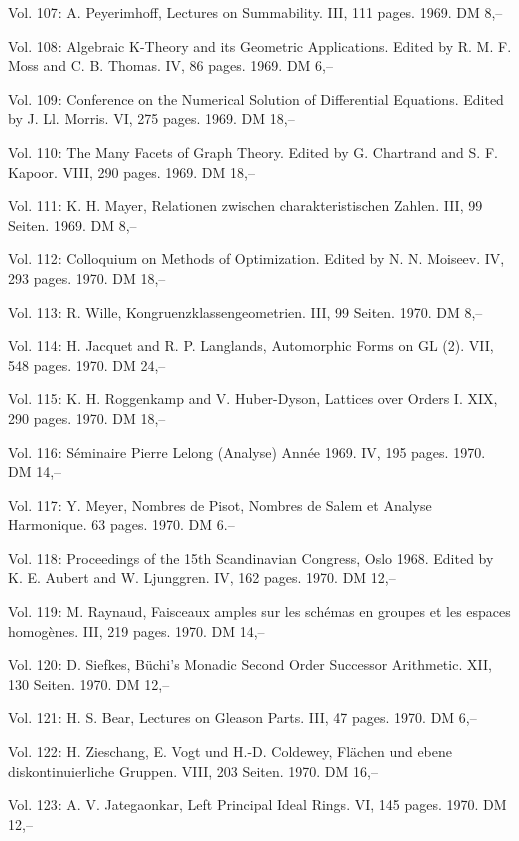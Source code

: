 Vol. 107: A. Peyerimhoff, Lectures on Summability. III, 111 pages. 1969. DM 8,--

Vol. 108: Algebraic K-Theory and its Geometric Applications. Edited by R. M. F. Moss and C. B. Thomas. IV, 86 pages. 1969. DM 6,--

Vol. 109: Conference on the Numerical Solution of Differential Equations. Edited by J. Ll. Morris. VI, 275 pages. 1969. DM 18,--

Vol. 110: The Many Facets of Graph Theory. Edited by G. Chartrand and S. F. Kapoor. VIII, 290 pages. 1969. DM 18,--

%
Vol. 111: K. H. Mayer, Relationen zwischen charakteristischen Zahlen. III, 99 Seiten. 1969. DM 8,--

Vol. 112: Colloquium on Methods of Optimization. Edited by N. N. Moiseev. IV, 293 pages. 1970. DM 18,--

Vol. 113: R. Wille, Kongruenzklassengeometrien. III, 99 Seiten. 1970. DM 8,--

Vol. 114: H. Jacquet and R. P. Langlands, Automorphic Forms on GL (2). VII, 548 pages. 1970. DM 24,--

Vol. 115: K. H. Roggenkamp and V. Huber-Dyson, Lattices over Orders I. XIX, 290 pages. 1970. DM 18,--

Vol. 116: Séminaire Pierre Lelong (Analyse) Année 1969. IV, 195 pages. 1970. DM 14,--

Vol. 117: Y. Meyer, Nombres de Pisot, Nombres de Salem et Analyse Harmonique. 63 pages. 1970. DM 6.--

Vol. 118: Proceedings of the 15th Scandinavian Congress, Oslo 1968. Edited by K. E. Aubert and W. Ljunggren. IV, 162 pages. 1970. DM 12,--

Vol. 119: M. Raynaud, Faisceaux amples sur les schémas en groupes et les espaces homogènes. III, 219 pages. 1970. DM 14,--

Vol. 120: D. Siefkes, Büchi's Monadic Second Order Successor Arithmetic. XII, 130 Seiten. 1970. DM 12,--

Vol. 121: H. S. Bear, Lectures on Gleason Parts. III, 47 pages. 1970. DM 6,--

Vol. 122: H. Zieschang, E. Vogt und H.-D. Coldewey, Flächen und ebene diskontinuierliche Gruppen. VIII, 203 Seiten. 1970. DM 16,--

Vol. 123: A. V. Jategaonkar, Left Principal Ideal Rings. VI, 145 pages. 1970. DM 12,--

